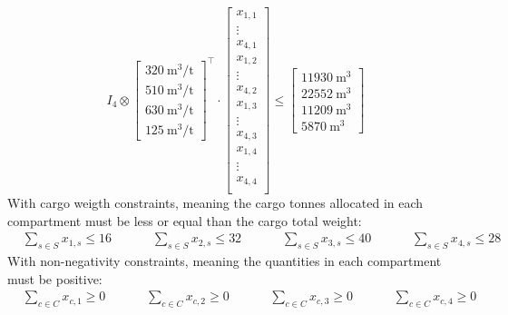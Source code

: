 \documentclass[unicode,11pt,a4paper,oneside,numbers=endperiod,openany]{scrartcl}
\begin{document}
\begin{equation*}
	\mathit{I}_4 \otimes
	\begin{bmatrix}
		\SI{320}{\meter^3\per\tonne} \\
		\SI{510}{\meter^3\per\tonne} \\
		\SI{630}{\meter^3\per\tonne} \\
		\SI{125}{\meter^3\per\tonne}
	\end{bmatrix}^{\top}
	\cdot
	\begin{bmatrix}
		x_{1,1} \\ \vdots \\ x_{4,1} \\
		x_{1,2} \\ \vdots \\ x_{4,2} \\
		x_{1,3} \\ \vdots \\ x_{4,3} \\
		x_{1,4} \\ \vdots \\ x_{4,4} \\
	\end{bmatrix}
	\leq
	\begin{bmatrix}
		\SI{11930}{\meter^3} \\
		\SI{22552}{\meter^3} \\
		\SI{11209}{\meter^3} \\
		\SI{5870}{\meter^3}
	\end{bmatrix}
\end{equation*}
With cargo weigth constraints, meaning the cargo tonnes allocated in each compartment must be less or equal
than the cargo total weight:
\begin{equation*}
	\begin{aligned}
		 &
		\sum_{s \in S} x_{1,s} \leq 16
		 &   &  &  &
		\sum_{s \in S} x_{2,s} \leq 32
		 &   &  &  &
		\sum_{s \in S} x_{3,s} \leq 40
		 &   &  &  &
		\sum_{s \in S} x_{4,s} \leq 28
	\end{aligned}
\end{equation*}
With non-negativity constraints, meaning the quantities in each compartment must be positive:
\begin{equation*}
	\begin{aligned}
		 &
		\sum_{c \in C} x_{c,1} \geq 0
		 &   &  &  &
		\sum_{c \in C} x_{c,2} \geq 0
		 &   &  &  &
		\sum_{c \in C} x_{c,3} \geq 0
		 &   &  &  &
		\sum_{c \in C} x_{c,4} \geq 0
	\end{aligned}
\end{equation*}
\end{document}
